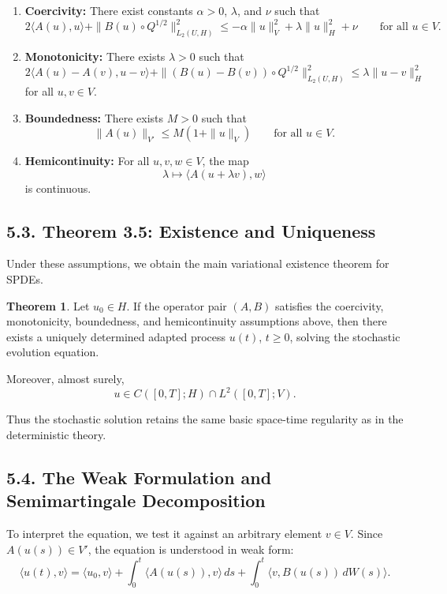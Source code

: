 \documentclass[11pt]{article}
\theoremstyle{definition}
\newtheorem{theorem}{Theorem}
\theoremstyle{remark}
\begin{document}
\begin{enumerate}
\item \textbf{Coercivity:} There exist constants \(\alpha>0\), \(\lambda\), and \(\nu\) such that
\[
2\langle A(u),u\rangle+\|B(u)\circ Q^{1/2}\|_{L_2(U,H)}^2
\le
-\alpha\|u\|_V^2+\lambda\|u\|_H^2+\nu
\qquad
\text{for all } u\in V.
\]

\item \textbf{Monotonicity:} There exists \(\lambda>0\) such that
\[
2\langle A(u)-A(v),u-v\rangle
+
\|(B(u)-B(v))\circ Q^{1/2}\|_{L_2(U,H)}^2
\le
\lambda\|u-v\|_H^2
\]
for all \(u,v\in V\).

\item \textbf{Boundedness:} There exists \(M>0\) such that
\[
\|A(u)\|_{V'}\le M(1+\|u\|_V)
\qquad
\text{for all } u\in V.
\]

\item \textbf{Hemicontinuity:} For all \(u,v,w\in V\), the map
\[
\lambda\mapsto \langle A(u+\lambda v),w\rangle
\]
is continuous.
\end{enumerate}

\subsection*{5.3. Theorem 3.5: Existence and Uniqueness}
Under these assumptions, we obtain the main variational existence theorem for SPDEs.

\begin{theorem}
Let \(u_0\in H\). If the operator pair \((A,B)\) satisfies the coercivity, monotonicity, boundedness, and hemicontinuity assumptions above, then there exists a uniquely determined adapted process \(u(t)\), \(t\ge 0\), solving the stochastic evolution equation.

Moreover, almost surely,
\[
u\in C([0,T];H)\cap L^2([0,T];V).
\]
\end{theorem}

Thus the stochastic solution retains the same basic space-time regularity as in the deterministic theory.

\subsection*{5.4. The Weak Formulation and Semimartingale Decomposition}
To interpret the equation, we test it against an arbitrary element \(v\in V\). Since \(A(u(s))\in V'\), the equation is understood in weak form:
\[
\langle u(t),v\rangle
=
\langle u_0,v\rangle
+
\int_0^t \langle A(u(s)),v\rangle\,ds
+
\int_0^t \langle v,B(u(s))\,dW(s)\rangle.
\]
\end{document}
